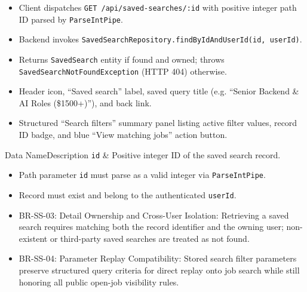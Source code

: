 \begin{itemize}[leftmargin=1.6em,topsep=3pt,itemsep=2pt,parsep=0pt,label=$\bullet$]
    \item Client dispatches \texttt{GET /api/saved-searches/:id} with positive integer path ID parsed by \texttt{ParseIntPipe}.
    \item Backend invokes \texttt{SavedSearchRepository.findByIdAndUserId(id, userId)}.
    \item {\sloppy Returns \texttt{SavedSearch} entity if found and owned; throws \texttt{Saved\allowbreak{}Search\allowbreak{}NotFound\allowbreak{}Exception} (HTTP 404) otherwise.\par}
\end{itemize}

\begin{itemize}[leftmargin=1.6em,topsep=3pt,itemsep=2pt,parsep=0pt,label=$\bullet$]
    \item Header icon, ``Saved search'' label, saved query title (e.g. ``Senior Backend \& AI Roles (\$1500+)''), and back link.
    \item Structured ``Search filters'' summary panel listing active filter values, record ID badge, and blue ``View matching jobs'' action button.
\end{itemize}


\begin{specdatatable}{Data Name}{Description}
\texttt{id} & Positive integer ID of the saved search record.\\ \hline
\end{specdatatable}

\begin{itemize}[leftmargin=1.6em,topsep=3pt,itemsep=2pt,parsep=0pt,label=$\bullet$]
    \item Path parameter \texttt{id} must parse as a valid integer via \texttt{ParseIntPipe}.
    \item Record must exist and belong to the authenticated \texttt{userId}.
\end{itemize}

\begin{itemize}[leftmargin=1.6em,topsep=3pt,itemsep=2pt,parsep=0pt,label=$\bullet$]\brrulelist
    \item BR-SS-03: Detail Ownership and Cross-User Isolation: Retrieving a saved search requires matching both the record identifier and the owning user; non-existent or third-party saved searches are treated as not found.
    \item BR-SS-04: Parameter Replay Compatibility: Stored search filter parameters preserve structured query criteria for direct replay onto job search while still honoring all public open-job visibility rules.
\end{itemize}

